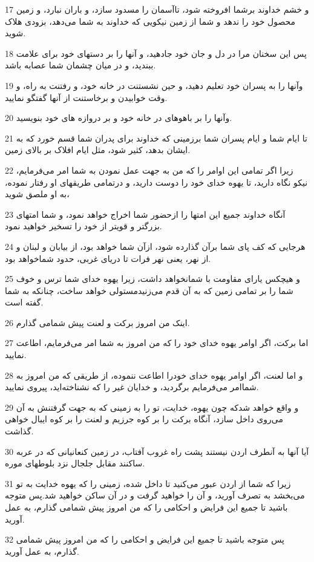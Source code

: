 \par 17 و خشم خداوند برشما افروخته شود، تاآسمان را مسدود سازد، و باران نبارد، و زمین محصول خود را ندهد و شما از زمین نیکویی که خداوند به شما می‌دهد، بزودی هلاک شوید.
\par 18 پس این سخنان مرا در دل و جان خود جادهید، و آنها را بر دستهای خود برای علامت ببندید، و در میان چشمان شما عصابه باشد.
\par 19 وآنها را به پسران خود تعلیم دهید، و حین نشستنت در خانه خود، و رفتنت به راه، و وقت خوابیدن و برخاستنت از آنها گفتگو نمایید.
\par 20 وآنها را بر باهوهای در خانه خود و بر دروازه های خود بنویسید.
\par 21 تا ایام شما و ایام پسران شما برزمینی که خداوند برای پدران شما قسم خورد که به ایشان بدهد، کثیر شود، مثل ایام افلاک بر بالای زمین.
\par 22 زیرا اگر تمامی این اوامر را که من به جهت عمل نمودن به شما امر می‌فرمایم، نیکو نگاه دارید، تا یهوه خدای خود را دوست دارید، و درتمامی طریقهای او رفتار نموده، به او ملصق شوید،
\par 23 آنگاه خداوند جمیع این امتها را ازحضور شما اخراج خواهد نمود، و شما امتهای بزرگتر و قویتر از خود را تسخیر خواهید نمود.
\par 24 هرجایی که کف پای شما برآن گذارده شود، ازآن شما خواهد بود، از بیابان و لبنان و از نهر، یعنی نهر فرات تا دریای غربی، حدود شماخواهد بود.
\par 25 و هیچکس یارای مقاومت با شمانخواهد داشت، زیرا یهوه خدای شما ترس و خوف شما را بر تمامی زمین که به آن قدم می‌زنیدمستولی خواهد ساخت، چنانکه به شما گفته است.
\par 26 اینک من امروز برکت و لعنت پیش شمامی گذارم.
\par 27 اما برکت، اگر اوامر یهوه خدای خود را که من امروز به شما امر می‌فرمایم، اطاعت نمایید.
\par 28 و اما لعنت، اگر اوامر یهوه خدای خودرا اطاعت ننموده، از طریقی که من امروز به شماامر می‌فرمایم برگردید، و خدایان غیر را که نشناخته‌اید، پیروی نمایید.
\par 29 و واقع خواهد شدکه چون یهوه، خدایت، تو را به زمینی که به جهت گرفتنش به آن می‌روی داخل سازد، آنگاه برکت را بر کوه جرزیم و لعنت را بر کوه ایبال خواهی گذاشت.
\par 30 آیا آنها به آنطرف اردن نیستند پشت راه غروب آفتاب، در زمین کنعانیانی که در عربه ساکنند مقابل جلجال نزد بلوطهای موره.
\par 31 زیرا که شما از اردن عبور می‌کنید تا داخل شده، زمینی را که یهوه خدایت به تو می‌بخشد به تصرف آورید، و آن را خواهید گرفت و در آن ساکن خواهید شد.پس متوجه باشید تا جمیع این فرایض و احکامی را که من امروز پیش شمامی گذارم، به عمل آورید.
\par 32 پس متوجه باشید تا جمیع این فرایض و احکامی را که من امروز پیش شمامی گذارم، به عمل آورید.
 
